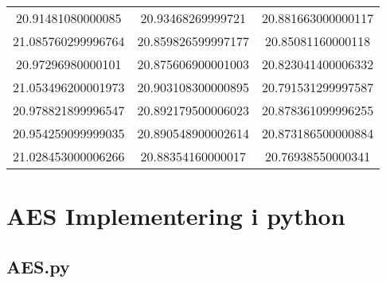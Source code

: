 \begin{table}[H]
\begin{tabular}{ ||c|c|c|| }
      20.91481080000085 & 20.93468269999721 & 20.881663000000117 \\
      21.085760299996764 & 20.859826599997177 & 20.85081160000118 \\
      20.97296980000101 & 20.875606900001003 & 20.823041400006332 \\
      21.053496200001973 & 20.903108300000895 & 20.791531299997587 \\
      20.978821899996547 & 20.892179500006023 & 20.878361099996255 \\
      20.954259099999035 & 20.890548900002614 & 20.873186500000884 \\
      21.028453000006266 & 20.88354160000017 & 20.76938550000341 \\
      \hline
    \end{tabular}
  \end{table}

\chapter{AES Implementering i python}
\label{app:python}

\section{AES.py}

